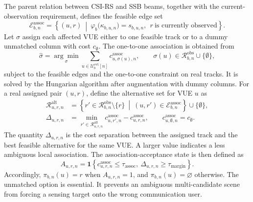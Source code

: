 The parent relation between CSI-RS and SSB beams, together with the
current-observation requirement, defines the feasible edge set
\begin{equation}
    \mathcal{E}^{\mathrm{assoc}}_{b,n}
    =
    \left\{(u,r)\ \middle|\ \varphi_b\bigl(\kappa_{b,u,n}\bigr)=s_{b,u,n},\
    \ r\ \text{is currently observed}\right\}.
    \label{eq:method-association-feasibility}
\end{equation}
Let \(\sigma\) assign each affected VUE either to one feasible track or to a
dummy unmatched column with cost \(c_{\emptyset}\).  The one-to-one association
is obtained from
\begin{equation}
    \widehat{\sigma}
    =
    \underset{\sigma}{\arg\min}
    \sum_{u\in\mathcal{U}^{\mathrm{evt}}_b[n]}c^{\mathrm{assoc}}_{u,\sigma(u),n},
    \qquad
    \sigma(u)\in\mathcal{R}^{\mathrm{obs}}_{b,n}\cup\{\emptyset\},
    \label{eq:method-association-assignment}
\end{equation}
subject to the feasible edges and the one-to-one constraint on real tracks.  It
is solved by the Hungarian algorithm after augmentation with dummy columns.
For a real assigned pair \((u,r)\), define the alternative set for VUE \(u\) as
\begin{align}
    \mathcal{R}^{\mathrm{alt}}_{u,r,n}
    & =
    \left\{r'\in\mathcal{R}^{\mathrm{obs}}_{b,n}\setminus\{r\}
    \ \middle|\ (u,r')\in\mathcal{E}^{\mathrm{assoc}}_{b,n}\right\}
    \cup\{\emptyset\},
    \label{eq:method-association-alternatives}\\
    \Delta_{u,r,n}
    & =
    \min_{r'\in\mathcal{R}^{\mathrm{alt}}_{u,r,n}}
    c^{\mathrm{assoc}}_{u,r',n}
    -c^{\mathrm{assoc}}_{u,r,n},
    \qquad
    c^{\mathrm{assoc}}_{u,\emptyset,n}=c_{\emptyset}.
    \label{eq:method-association-margin}
\end{align}
The quantity \(\Delta_{u,r,n}\) is the cost separation between the assigned
track and the best feasible alternative for the same VUE.  A larger value
indicates a less ambiguous local association.  The association-acceptance state
is then defined as
\begin{equation}
    A_{u,r,n}
    =
    \mathbf{1}\!\left\{c^{\mathrm{assoc}}_{u,r,n}\leq\tau_{\mathrm{assoc}},\
    \Delta_{u,r,n}\geq\tau_{\mathrm{margin}}\right\}.
    \label{eq:method-association-acceptance}
\end{equation}
Accordingly, \(\pi_{b,n}(u)=r\) when \(A_{u,r,n}=1\), and
\(\pi_{b,n}(u)=\varnothing\) otherwise.  The unmatched option is essential.  It
prevents an ambiguous multi-candidate scene from forcing a sensing target onto
the wrong communication user.

